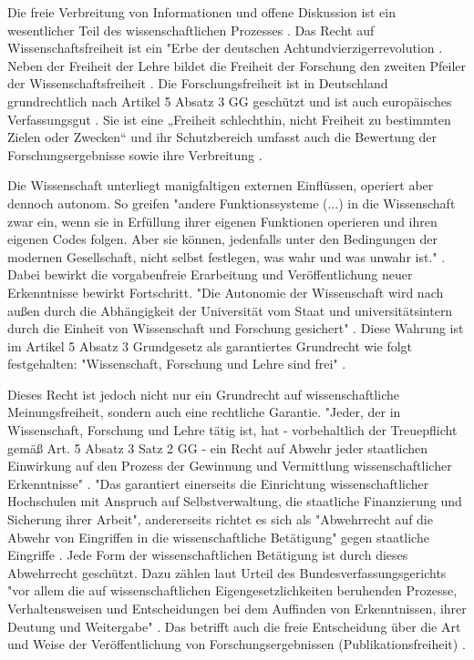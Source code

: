 Die freie Verbreitung von Informationen und offene Diskussion ist ein wesentlicher Teil des wissenschaftlichen Prozesses \cite{edsall_1976_scientific}. Das Recht auf Wissenschaftsfreiheit ist ein "Erbe der deutschen Achtundvierzigerrevolution \cite{kempny_2013_wissfreiheit}. Neben der Freiheit der Lehre bildet die Freiheit der Forschung den zweiten Pfeiler der Wissenschaftsfreiheit \cite{thurnherr_2014_pubfreiheit}. Die Forschungsfreiheit ist in Deutschland grundrechtlich nach Artikel 5 Absatz 3 GG  geschützt und ist auch europäisches Verfassungsgut \cite{kempny_2013_wissfreiheit}. Sie ist eine „Freiheit schlechthin, nicht Freiheit zu bestimmten Zielen oder Zwecken“ \cite{Boeckenfoerde_1974} und ihr Schutzbereich umfasst auch die Bewertung der Forschungsergebnisse sowie ihre Verbreitung \cite{Pfeiffer_2013_forschungsfreiheit}.

Die Wissenschaft unterliegt manigfaltigen externen Einflüssen, operiert aber dennoch autonom. So greifen "andere Funktionssysteme (...) in die Wissenschaft zwar ein, wenn sie in Erfüllung ihrer eigenen Funktionen operieren und ihren eigenen Codes folgen. Aber sie können, jedenfalls unter den Bedingungen der modernen Gesellschaft, nicht selbst festlegen, was wahr und was unwahr ist."  \cite{Luhmann1998}. Dabei bewirkt die vorgabenfreie Erarbeitung und Veröffentlichung neuer Erkenntnisse bewirkt Fortschritt. "Die Autonomie der Wissenschaft wird nach außen durch die Abhängigkeit der Universität vom Staat und universitätsintern durch die Einheit von Wissenschaft und Forschung gesichert" \cite{Huber_2005}. Diese Wahrung ist im Artikel 5 Absatz 3 Grundgesetz als garantiertes Grundrecht wie folgt festgehalten: "Wissenschaft, Forschung und Lehre sind frei" \cite{suchen_GG}.

Dieses Recht ist jedoch nicht nur ein Grundrecht auf wissenschaftliche Meinungsfreiheit, sondern auch eine rechtliche Garantie. "Jeder, der in Wissenschaft, Forschung und Lehre tätig ist, hat - vorbehaltlich der Treuepflicht gemäß Art. 5 Absatz 3 Satz 2 GG - ein Recht auf Abwehr jeder staatlichen Einwirkung auf den Prozess der Gewinnung und Vermittlung wissenschaftlicher Erkenntnisse" \cite{suchen_BVG}. "Das garantiert einerseits die Einrichtung wissenschaftlicher Hochschulen mit Anspruch auf Selbstverwaltung, die staatliche Finanzierung und Sicherung ihrer Arbeit"\cite{suchen_BVG}, andererseits richtet es sich als "Abwehrrecht auf die Abwehr von Eingriffen in die wissenschaftliche Betätigung" gegen staatliche Eingriffe \cite{mayen_grundrechte_forscher} \cite{spindler_2006_rechtloa}. Jede Form der wissenschaftlichen Betätigung ist durch dieses Abwehrrecht geschützt. Dazu zählen laut Urteil des Bundesverfassungsgerichts "vor allem die auf wissenschaftlichen Eigengesetzlichkeiten beruhenden Prozesse, Verhaltensweisen und Entscheidungen bei dem Auffinden von Erkenntnissen, ihrer Deutung und Weitergabe" \cite{suchen}. Das betrifft auch die freie Entscheidung über die Art und Weise der Veröffentlichung von Forschungsergebnissen (Publikationsfreiheit) \cite{Fangerau_2014} \cite[:190]{Fehling_2014}.

